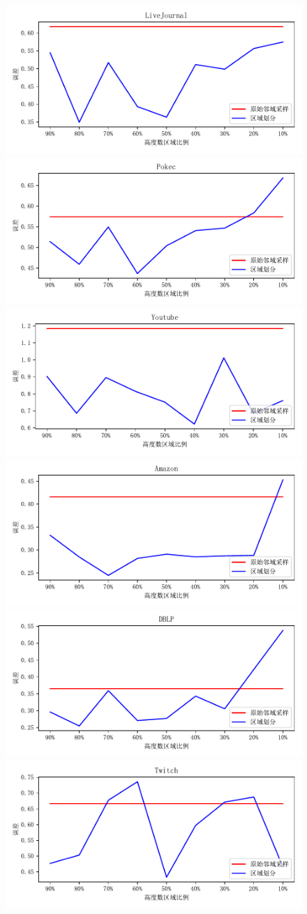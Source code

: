 \documentclass[master]{thesis-uestc}
\begin{document}
\begin{figure}[h]
    \centering
    \includegraphics[width=0.5\linewidth]{pic/partition/LiveJournal.pdf}%
    \includegraphics[width=0.5\linewidth]{pic/partition/Pokec.pdf}\\
    \includegraphics[width=0.5\linewidth]{pic/partition/Youtube.pdf}%
    \includegraphics[width=0.5\linewidth]{pic/partition/Amazon.pdf}\\
    \includegraphics[width=0.5\linewidth]{pic/partition/DBLP.pdf}%
    \includegraphics[width=0.5\linewidth]{pic/partition/Twitch.pdf}\\

\end{figure}
\end{document}
